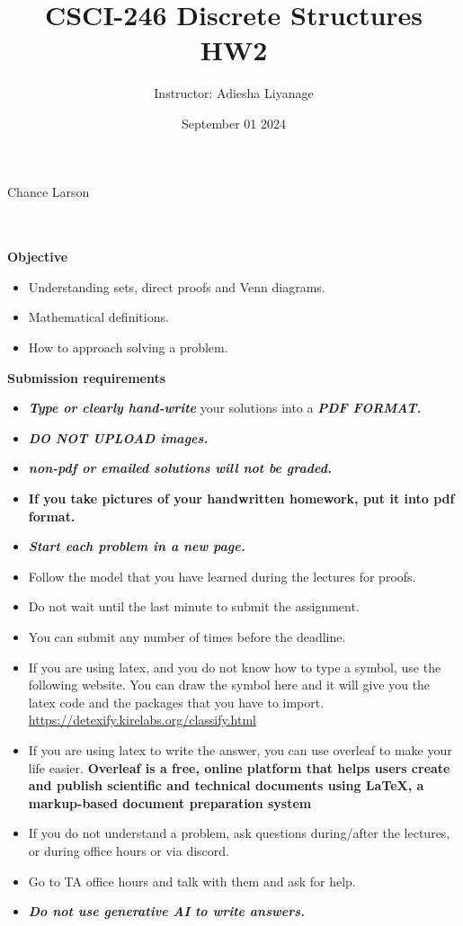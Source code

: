 Chance Larson\documentclass[12pt]{exam}
\title{CSCI-246 Discrete Structures HW2}
\author{Instructor: Adiesha Liyanage}
\date{September 01 2024}
\begin{document}
\maketitle

\hrulefill
\\
\\
\textbf{Objective}
\begin{itemize}
    \item Understanding sets, direct proofs and Venn diagrams.
    \item Mathematical definitions.
    \item How to approach solving a problem.
\end{itemize}

\textbf{Submission requirements}
\begin{itemize}
    \item \textbf{\textit{Type or clearly hand-write}} your solutions into a \textbf{\textit{PDF FORMAT.}} 
    \item \textbf{\textit{DO NOT UPLOAD images.}}
    \item \textbf{\textit{non-pdf or emailed solutions will not be graded.}}
    \item \textbf{If you take pictures of your handwritten homework, put it into pdf format.}
    \item \textbf{\textit{Start each problem in a new page.}}
    \item Follow the model that you have learned during the lectures for proofs.
    \item Do not wait until the last minute to submit the assignment.
    \item You can submit any number of times before the deadline. 
    \item If you are using latex, and you do not know how to type a symbol, use the following website. You can draw the symbol here and it will give you the latex code and the packages that you have to import. \url{https://detexify.kirelabs.org/classify.html}
    \item If you are using latex to write the answer, you can use overleaf to make your life easier. \textbf{Overleaf is a free, online platform that helps users create and publish scientific and technical documents using LaTeX, a markup-based document preparation system}
    \item If you do not understand a problem, ask questions during/after the lectures, or during office hours or via discord.
    \item Go to TA office hours and talk with them and ask for help.
    \item \textbf{\textit{Do not use generative AI to write answers.}} 
\end{itemize}
\end{document}
